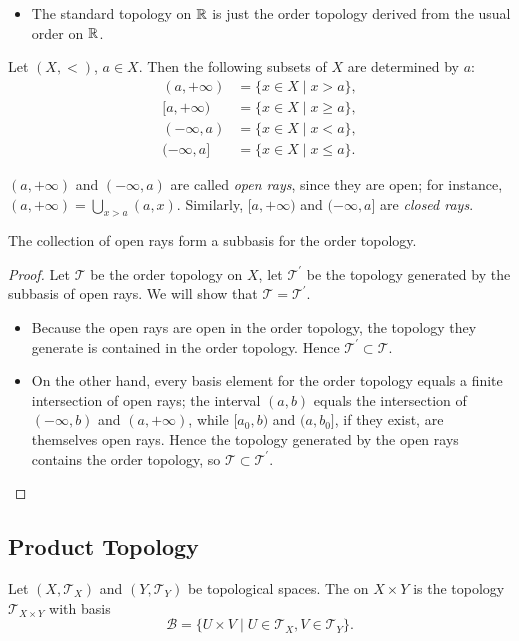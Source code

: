 \begin{example}
\begin{itemize}
\item The standard topology on $\mathbb R$ is just the order topology derived from the usual order on $\mathbb R$.
\end{itemize}
\end{example}

\begin{definition}
Let $(X,<)$, $a\in X$. Then the following subsets of $X$ are  determined by $a$:
\begin{align*}
(a,+\infty)&=\{x\in X\mid x>a\},\\
[a,+\infty)&=\{x\in X\mid x\ge a\},\\
(-\infty,a)&=\{x\in X\mid x<a\},\\
(-\infty,a]&=\{x\in X\mid x\le a\}.
\end{align*}
\end{definition}

$(a,+\infty)$ and $(-\infty,a)$ are called \emph{open rays}, since they are open; for instance, $(a,+\infty)=\bigcup_{x>a}(a,x)$. Similarly, $[a,+\infty)$ and $(-\infty,a]$ are \emph{closed rays}.

\begin{lemma}
The collection of open rays form a subbasis for the order topology.
\end{lemma}

\begin{proof}
Let $\mathcal{T}$ be the order topology on $X$, let $\mathcal{T}^\prime$ be the topology generated by the subbasis of open rays. We will show that $\mathcal{T}=\mathcal{T}^\prime$.
\begin{itemize}
\item Because the open rays are open in the order topology, the topology they generate is contained in the order topology. Hence $\mathcal{T}^\prime\subset\mathcal{T}$.
\item On the other hand, every basis element for the order topology equals a finite intersection of open rays; the interval $(a,b)$ equals the intersection of $(-\infty,b)$ and $(a,+\infty)$, while $[a_0,b)$ and $(a,b_0]$, if they exist, are themselves open rays. Hence the topology generated by the open rays contains the order topology, so $\mathcal{T}\subset\mathcal{T}^\prime$.
\end{itemize}
\end{proof}

\subsection{Product Topology}
\begin{definition}
Let $(X,\mathcal{T}_X)$ and $(Y,\mathcal{T}_Y)$ be topological spaces. The  on $X\times Y$ is the topology $\mathcal{T}_{X\times Y}$ with basis
\[\mathcal{B}=\{U\times V\mid U\in\mathcal{T}_X,V\in\mathcal{T}_Y\}.\]
\end{definition}


